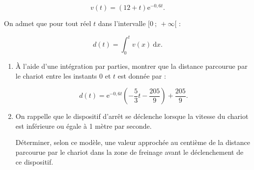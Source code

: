 \documentclass[10pt]{article}
\providecommand{\e}{{\mathrm{e}}}
\begin{document}
\[v(t) = (12 + t)\e^{-0,6t}.\]

On admet que pour tout réel $t$ dans l'intervalle $[0~;~ +\infty[$ :

\[d(t) = \displaystyle\int_0^t v(x)\:\text{d}x.\]

\smallskip

\begin{enumerate}
\item À l'aide d'une intégration par parties, montrer que la distance parcourue par le
chariot entre les instants 0 et $t$ est donnée par : 

\[d(t)= \e^{-0,6t} \left(- \dfrac53 t - \dfrac{205}{9}\right) + \dfrac{205}{9}.\]

\item On rappelle que le dispositif d'arrêt se déclenche lorsque la vitesse du chariot est inférieure ou égale à 1 mètre par seconde.

Déterminer, selon ce modèle, une valeur approchée au centième de la distance parcourue par le chariot dans la zone de freinage avant le déclenchement de ce dispositif.
\end{enumerate}
\end{document}

